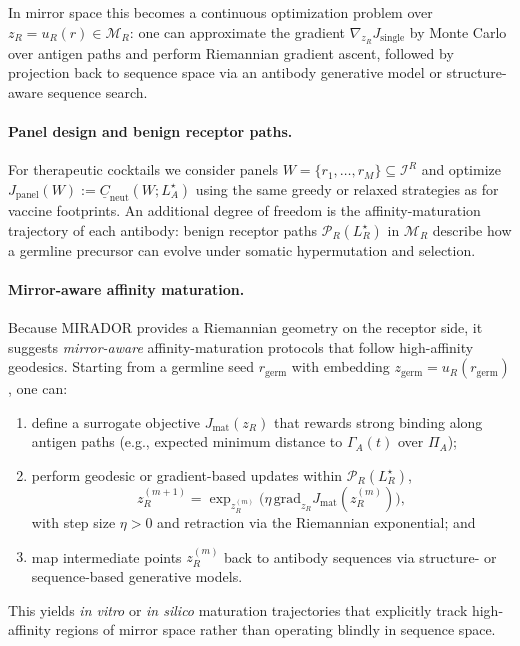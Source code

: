\documentclass[11pt]{article}
\begin{document}
In mirror space this becomes a continuous optimization problem over $z_R = u_R(r) \in \mathcal{M}_R$:
one can approximate the gradient $\nabla_{z_R} J_{\mathrm{single}}$ by Monte Carlo over antigen
paths and perform Riemannian gradient ascent, followed by projection back to sequence space via
an antibody generative model or structure-aware sequence search.

\paragraph{Panel design and benign receptor paths.}
For therapeutic cocktails we consider panels $W = \{r_1,\dots,r_M\} \subseteq \mathcal{I}^R$ and
optimize $J_{\mathrm{panel}}(W) := \underline{C}_{\mathrm{neut}}(W;L_A^\star)$ using the same
greedy or relaxed strategies as for vaccine footprints. An additional degree of freedom is the
affinity-maturation trajectory of each antibody: benign receptor paths
$\mathcal{P}_R(L_R^\star)$ in $\mathcal{M}_R$ describe how a germline precursor can evolve under
somatic hypermutation and selection.

\paragraph{Mirror-aware affinity maturation.}
Because MIRADOR provides a Riemannian geometry on the receptor side, it suggests
\emph{mirror-aware} affinity-maturation protocols that follow high-affinity geodesics. Starting from
a germline seed $r_{\mathrm{germ}}$ with embedding $z_{\mathrm{germ}} = u_R(r_{\mathrm{germ}})$,
one can:
\begin{enumerate}
  \item define a surrogate objective $J_{\mathrm{mat}}(z_R)$ that rewards strong binding along
        antigen paths (e.g., expected minimum distance to $\Gamma_A(t)$ over $\Pi_A$);
  \item perform geodesic or gradient-based updates within $\mathcal{P}_R(L_R^\star)$,
        \[
          z_R^{(m+1)} = \exp_{z_R^{(m)}}\bigl( \eta \,\mathrm{grad}_{z_R} J_{\mathrm{mat}}(z_R^{(m)}) \bigr),
        \]
        with step size $\eta > 0$ and retraction via the Riemannian exponential; and
  \item map intermediate points $z_R^{(m)}$ back to antibody sequences via structure- or
        sequence-based generative models.
\end{enumerate}
This yields \emph{in vitro} or \emph{in silico} maturation trajectories that explicitly track
high-affinity regions of mirror space rather than operating blindly in sequence space.
\end{document}
